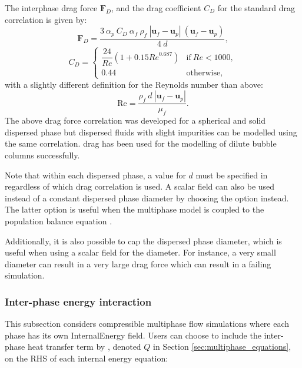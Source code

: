 The interphase drag force $\mathbf{F}_D$, and the drag coefficient $C_D$ for the standard \cite{schiller1935drag} drag correlation is given by:
\begin{equation}\label{eq:schillernaumann_drag_force}
\mathbf{F}_D = \frac{3\ \alpha_p\ C_D\ \alpha_f\ \rho_f\ |\mathbf{u}_f-\mathbf{u}_p|\ (\mathbf{u}_f-\mathbf{u}_p)}{4\ d},
\end{equation}
\begin{equation}\label{eq:schillernaumann_drag_coefficient}
C_D=
\begin{cases}
  \dfrac{24}{Re} \left( 1+0.15 {Re}^{0.687} \right)& \text{if}\ Re<1000, \\[2ex]
  0.44                                               & \text{otherwise},
\end{cases}
\end{equation}
with a slightly different definition for the Reynolds number than above:
\begin{equation}\label{eq:particle_reynolds_number_2}
\mathrm{Re} = \frac{\rho_f\ d\ |\mathbf{u}_f-\mathbf{u}_p|}{\mu_f}.
\end{equation}
The above drag force correlation was developed for a spherical and solid dispersed phase but dispersed fluids with slight impurities can be modelled using the same correlation. \cite{schiller1935drag} drag has been used for the modelling of dilute bubble columns successfully.

Note that within each dispersed phase, a value for $d$ must be specified in  regardless of which drag correlation is used. A scalar field can also be used instead of a constant dispersed phase diameter by choosing the  option instead. The latter option is useful when the multiphase model is coupled to the population balance equation \citep{bhutani2016polydispersed}.

Additionally, it is also possible to cap the dispersed phase diameter, which is useful when using a scalar field for the diameter. For instance, a very small diameter can result in a very large drag force which can result in a failing simulation.

\subsubsection{Inter-phase energy interaction}
This subsection considers compressible multiphase flow simulations where each phase has its own InternalEnergy field. Users can choose to include the inter-phase heat transfer term by \cite{gunn1978}, denoted $Q$ in Section \ref{sec:multiphase_equations}, on the RHS of each internal energy equation:

